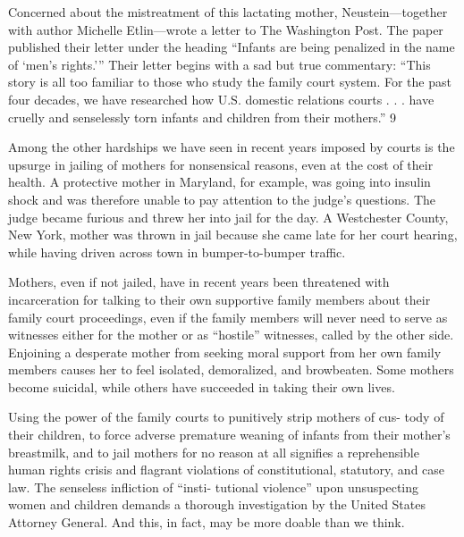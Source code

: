 Concerned about the mistreatment of this lactating mother,
Neustein—together with author Michelle Etlin—wrote a letter to The
Washington Post. The paper published their letter under the heading
“Infants are being penalized in the name of ‘men’s rights.’” Their letter
begins with a sad but true commentary: “This story is all too familiar to
those who study the family court system. For the past four decades, we
have researched how U.S. domestic relations courts . . . have cruelly and
senselessly torn infants and children from their mothers.” 9 \pfl{}



Among the other hardships we have seen in recent years imposed by
courts is the upsurge in jailing of mothers for nonsensical reasons, even
at the cost of their health. A protective mother in Maryland, for example,
was going into insulin shock and was therefore unable to pay attention
to the judge’s questions. The judge became furious and threw her into
jail for the day. A Westchester County, New York, mother was thrown
in jail because she came late for her court hearing, while having driven
across town in bumper-to-bumper traffic. \pfl{}


Mothers, even if not jailed, have in recent years been threatened with
incarceration for talking to their own supportive family members about
their family court proceedings, even if the family members will never
need to serve as witnesses either for the mother or as “hostile” witnesses,
called by the other side. Enjoining a desperate mother from seeking
moral support from her own family members causes her to feel isolated,
demoralized, and browbeaten. Some mothers become suicidal, while
others have succeeded in taking their own lives. \pfl{}


Using the power of the family courts to punitively strip mothers of cus-
tody of their children, to force adverse premature weaning of infants
from their mother’s breastmilk, and to jail mothers for no reason at all
signifies a reprehensible human rights crisis and flagrant violations of
constitutional, statutory, and case law. The senseless infliction of “insti-
tutional violence” upon unsuspecting women and children demands a
thorough investigation by the United States Attorney General. And this,
in fact, may be more doable than we think. \pfl{}


